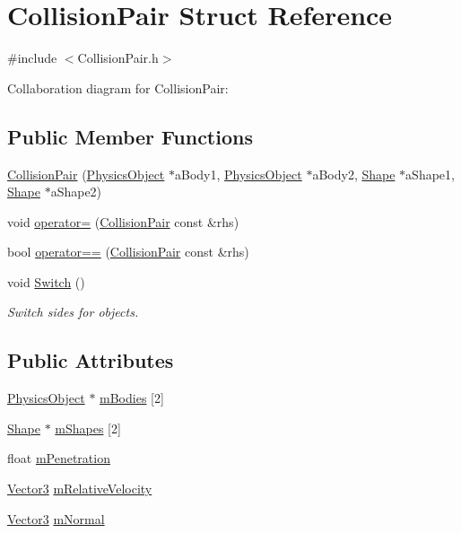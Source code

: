 \hypertarget{structCollisionPair}{}\section{Collision\+Pair Struct Reference}
\label{structCollisionPair}


{\ttfamily \#include $<$Collision\+Pair.\+h$>$}



Collaboration diagram for Collision\+Pair\+:
\subsection*{Public Member Functions}
\begin{DoxyCompactItemize}
\item 
\hyperlink{structCollisionPair_a05d5fb49e2b17348dd83b1139d1c5be5}{Collision\+Pair} (\hyperlink{classPhysicsObject}{Physics\+Object} $\ast$a\+Body1, \hyperlink{classPhysicsObject}{Physics\+Object} $\ast$a\+Body2, \hyperlink{structShape}{Shape} $\ast$a\+Shape1, \hyperlink{structShape}{Shape} $\ast$a\+Shape2)
\item 
void \hyperlink{structCollisionPair_ada57982d0749264b5fff1d5a977932d2}{operator=} (\hyperlink{structCollisionPair}{Collision\+Pair} const \&rhs)
\item 
bool \hyperlink{structCollisionPair_ac481c2f34b99b9e3a218d44c66610d41}{operator==} (\hyperlink{structCollisionPair}{Collision\+Pair} const \&rhs)
\item 
void \hyperlink{structCollisionPair_aa92191244a6c5bbc3b4fd2d1bbef350b}{Switch} ()
\begin{DoxyCompactList}\small\item\em Switch sides for objects. \end{DoxyCompactList}\end{DoxyCompactItemize}
\subsection*{Public Attributes}
\begin{DoxyCompactItemize}
\item 
\hyperlink{classPhysicsObject}{Physics\+Object} $\ast$ \hyperlink{structCollisionPair_a8cd94df2e37f03c3646624187f0019ba}{m\+Bodies} \mbox{[}2\mbox{]}
\item 
\hyperlink{structShape}{Shape} $\ast$ \hyperlink{structCollisionPair_ac6db0c6dd34e89f672736c776c6fc648}{m\+Shapes} \mbox{[}2\mbox{]}
\item 
float \hyperlink{structCollisionPair_ac83cb38a76dbbfae67c49e5e1da010b4}{m\+Penetration}
\item 
\hyperlink{structVector3}{Vector3} \hyperlink{structCollisionPair_a65c270e50cdf60e279a4f4a0ece62900}{m\+Relative\+Velocity}
\item 
\hyperlink{structVector3}{Vector3} \hyperlink{structCollisionPair_ab5a7d924e1c82a966638e5b8471ff086}{m\+Normal}
\end{DoxyCompactItemize}


